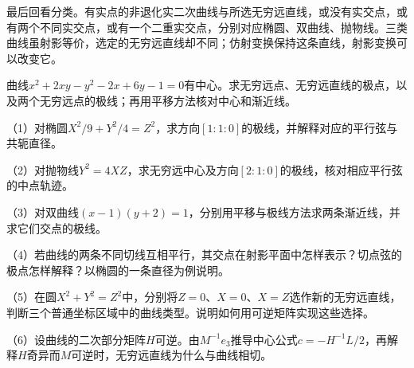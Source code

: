 最后回看分类。有实点的非退化实二次曲线与所选无穷远直线，或没有实交点，或有两个不同实交点，或有一个二重实交点，分别对应椭圆、双曲线、抛物线。三类曲线虽射影等价，选定的无穷远直线却不同；仿射变换保持这条直线，射影变换可以改变它。

\par\addvspace{6pt}
\noindent\begin{minipage}{\linewidth}
\begin{example}
曲线\(x^2+2xy-y^2-2x+6y-1=0\)有中心。求无穷远点、无穷远直线的极点，以及两个无穷远点的极线；再用平移方法核对中心和渐近线。
\end{example}
\end{minipage}\par\addvspace{6pt}

\begin{exercise}
\mbox{}\par\nobreak
\begin{samepage}
（1）对椭圆\(X^2/9+Y^2/4=Z^2\)，求方向\([1:1:0]\)的极线，并解释对应的平行弦与共轭直径。
\par
\end{samepage}

\begin{samepage}
（2）对抛物线\(Y^2=4XZ\)，求无穷远中心及方向\([2:1:0]\)的极线，核对相应平行弦的中点轨迹。
\par
\end{samepage}

\begin{samepage}
（3）对双曲线\((x-1)(y+2)=1\)，分别用平移与极线方法求两条渐近线，并求它们交点的极线。
\par
\end{samepage}

\begin{samepage}
（4）若曲线的两条不同切线互相平行，其交点在射影平面中怎样表示？切点弦的极点怎样解释？以椭圆的一条直径为例说明。
\par
\end{samepage}

\begin{samepage}
（5）在圆\(X^2+Y^2=Z^2\)中，分别将\(Z=0\)、\(X=0\)、\(X=Z\)选作新的无穷远直线，判断三个普通坐标区域中的曲线类型。说明如何用可逆矩阵实现这些选择。
\par
\end{samepage}

\begin{samepage}
（6）设曲线的二次部分矩阵\(H\)可逆。由\(M^{-1}e_3\)推导中心公式\(c=-H^{-1}L/2\)，再解释\(H\)奇异而\(M\)可逆时，无穷远直线为什么与曲线相切。
\par
\end{samepage}
\end{exercise}
